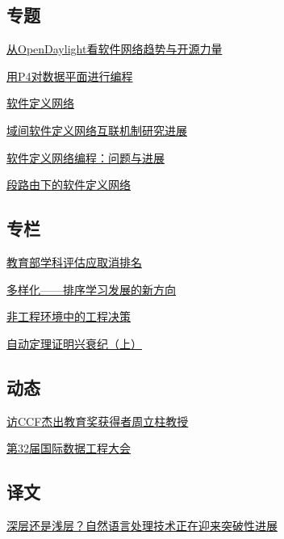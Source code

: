 \documentclass[a4paper]{article}
\begin{document}
\subsection{专题}
\href{http://history.ccf.org.cn/resources/1190201776262/2016/07/12/3.pdf}{从OpenDaylight看软件网络趋势与开源力量}

\href{http://history.ccf.org.cn/resources/1190201776262/2016/07/12/2nick.pdf}{用P4对数据平面进行编程}

\href{http://history.ccf.org.cn/resources/1190201776262/2016/07/12/1.pdf}{软件定义网络}

\href{http://history.ccf.org.cn/resources/1190201776262/2016/07/12/5bijun.pdf}{域间软件定义网络互联机制研究进展}

\href{http://history.ccf.org.cn/resources/1190201776262/2016/07/12/4yangyang.pdf}{软件定义网络编程：问题与进展}

\href{http://history.ccf.org.cn/resources/1190201776262/2016/07/12/6zhouwu.pdf}{段路由下的软件定义网络}

\subsection{专栏}
\href{http://history.ccf.org.cn/resources/1190201776262/2016/07/15/p53.pdf}{教育部学科评估应取消排名}

\href{http://history.ccf.org.cn/resources/1190201776262/2016/07/12/8xujun.pdf}{多样化——排序学习发展的新方向}

\href{http://history.ccf.org.cn/resources/1190201776262/2016/07/12/9David1.pdf}{非工程环境中的工程决策}

\href{http://history.ccf.org.cn/resources/1190201776262/2016/07/12/7nick-new.pdf}{自动定理证明兴衰纪（上）}

\subsection{动态}
\href{http://history.ccf.org.cn/resources/1190201776262/2016/07/12/12.pdf}{访CCF杰出教育奖获得者周立柱教授}

\href{http://history.ccf.org.cn/resources/1190201776262/2016/07/12/13.pdf}{第32届国际数据工程大会}

\subsection{译文}
\href{http://history.ccf.org.cn/resources/1190201776262/2016/07/12/14yiwen.pdf}{深层还是浅层？自然语言处理技术正在迎来突破性进展}
\end{document}
